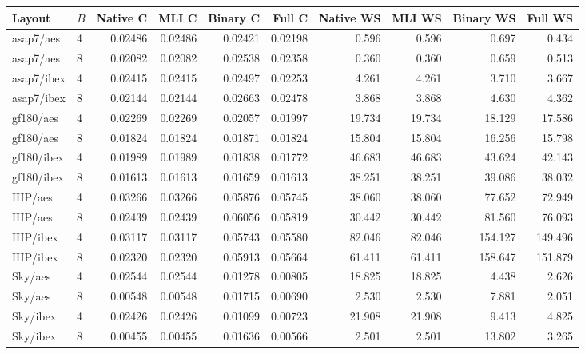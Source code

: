 \begin{tabular}{llrrrrrrrr}
\toprule
Layout & $B$ & Native C & MLI C & Binary C & Full C & Native WS & MLI WS & Binary WS & Full WS \\
\midrule
asap7/aes & 4 & 0.02486 & 0.02486 & 0.02421 & 0.02198 & 0.596 & 0.596 & 0.697 & 0.434 \\
asap7/aes & 8 & 0.02082 & 0.02082 & 0.02538 & 0.02358 & 0.360 & 0.360 & 0.659 & 0.513 \\
asap7/ibex & 4 & 0.02415 & 0.02415 & 0.02497 & 0.02253 & 4.261 & 4.261 & 3.710 & 3.667 \\
asap7/ibex & 8 & 0.02144 & 0.02144 & 0.02663 & 0.02478 & 3.868 & 3.868 & 4.630 & 4.362 \\
gf180/aes & 4 & 0.02269 & 0.02269 & 0.02057 & 0.01997 & 19.734 & 19.734 & 18.129 & 17.586 \\
gf180/aes & 8 & 0.01824 & 0.01824 & 0.01871 & 0.01824 & 15.804 & 15.804 & 16.256 & 15.798 \\
gf180/ibex & 4 & 0.01989 & 0.01989 & 0.01838 & 0.01772 & 46.683 & 46.683 & 43.624 & 42.143 \\
gf180/ibex & 8 & 0.01613 & 0.01613 & 0.01659 & 0.01613 & 38.251 & 38.251 & 39.086 & 38.032 \\
IHP/aes & 4 & 0.03266 & 0.03266 & 0.05876 & 0.05745 & 38.060 & 38.060 & 77.652 & 72.949 \\
IHP/aes & 8 & 0.02439 & 0.02439 & 0.06056 & 0.05819 & 30.442 & 30.442 & 81.560 & 76.093 \\
IHP/ibex & 4 & 0.03117 & 0.03117 & 0.05743 & 0.05580 & 82.046 & 82.046 & 154.127 & 149.496 \\
IHP/ibex & 8 & 0.02320 & 0.02320 & 0.05913 & 0.05664 & 61.411 & 61.411 & 158.647 & 151.879 \\
Sky/aes & 4 & 0.02544 & 0.02544 & 0.01278 & 0.00805 & 18.825 & 18.825 & 4.438 & 2.626 \\
Sky/aes & 8 & 0.00548 & 0.00548 & 0.01715 & 0.00690 & 2.530 & 2.530 & 7.881 & 2.051 \\
Sky/ibex & 4 & 0.02426 & 0.02426 & 0.01099 & 0.00723 & 21.908 & 21.908 & 9.413 & 4.825 \\
Sky/ibex & 8 & 0.00455 & 0.00455 & 0.01636 & 0.00566 & 2.501 & 2.501 & 13.802 & 3.265 \\
\bottomrule
\end{tabular}

